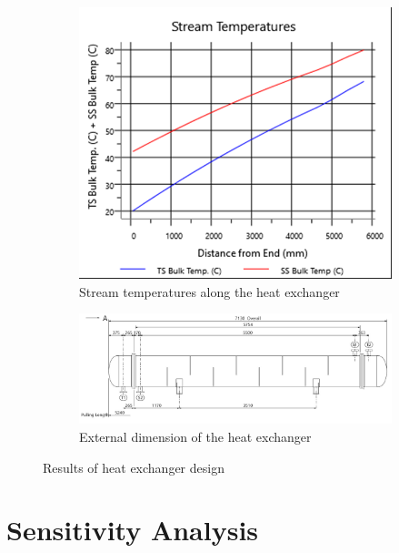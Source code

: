 \begin{figure}[h!]
	\centering
	\begin{subfigure}[b]{0.7\textwidth}
		\centering
		\includegraphics[trim= 0cm 0.1cm 0.1cm 0.5cm, clip, width=\textwidth]{Figures/Proces_Analysis/HX.png}
		\caption{Stream temperatures along the heat exchanger}
	\end{subfigure}
	\hfill
	\begin{subfigure}[b]{0.9\textwidth}
		\centering
		\includegraphics[width=\textwidth]{Figures/Proces_Analysis/HX2.jpg}
		\caption{External dimension of the heat exchanger}
	\end{subfigure}
	\caption{Results of heat exchanger design}
	\label{fig:Ester_HX}
\end{figure}



\section{Sensitivity Analysis}

